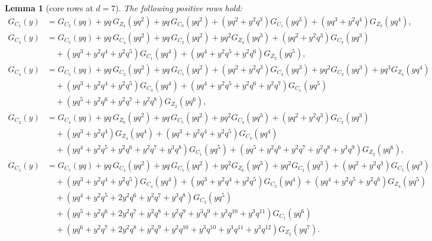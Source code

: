 \documentclass[11pt]{article}
\newtheorem{lemma}[theorem]{Lemma}
\newcommand{\G}[1]{G_{#1}}
\begin{document}
\begin{lemma}[core rows at $d=7$]\label{core}
The following positive rows hold:
\begin{align*}
\G{C_1}(y)&=\G{C_2}(yq)+yq\,\G{Z_4}(yq^{2})+yq\,\G{C_3}(yq^{2})
 +(yq^{2}{+}y^{2}q^{3})\G{C_1}(yq^{3})+(yq^{3}{+}y^{2}q^{4})\G{Z_2}(yq^{4}),\\[2pt]
\G{C_3}(y)&=\G{C_5}(yq)+yq\,\G{C_4}(yq^{2})+yq\,\G{C_2}(yq^{2})
 +yq^{2}\G{Z_4}(yq^{3})+(yq^{2}{+}y^{2}q^{3})\G{C_3}(yq^{3})\\&\quad
 +(yq^{3}{+}y^{2}q^{4}{+}y^{2}q^{5})\G{C_1}(yq^{4})
 +(yq^{4}{+}y^{2}q^{5}{+}y^{2}q^{6})\G{Z_2}(yq^{5}),\\[2pt]
\G{C_4}(y)&=\G{C_5}(yq)+yq\,\G{C_2}(yq^{2})+yq\,\G{C_5}(yq^{2})
 +(yq^{2}{+}y^{2}q^{3})\G{C_4}(yq^{3})+yq^{2}\G{C_2}(yq^{3})
 +yq^{3}\G{Z_4}(yq^{4})\\&\quad
 +(yq^{3}{+}y^{2}q^{4}{+}y^{2}q^{5})\G{C_3}(yq^{4})
 +(yq^{4}{+}y^{2}q^{5}{+}y^{2}q^{6}{+}y^{2}q^{7})\G{C_1}(yq^{5})\\&\quad
 +(yq^{5}{+}y^{2}q^{6}{+}y^{2}q^{7}{+}y^{2}q^{8})\G{Z_2}(yq^{6}),\\[2pt]
\G{C_2}(y)&=\G{C_4}(yq)+yq\,\G{Z_6}(yq^{2})+yq\,\G{C_5}(yq^{2})
 +yq^{2}\G{C_4}(yq^{3})+(yq^{2}{+}y^{2}q^{3})\G{C_2}(yq^{3})\\&\quad
 +(yq^{3}{+}y^{2}q^{4})\G{Z_4}(yq^{4})
 +(yq^{3}{+}y^{2}q^{4}{+}y^{2}q^{5})\G{C_3}(yq^{4})\\&\quad
 +(yq^{4}{+}y^{2}q^{5}{+}y^{2}q^{6}{+}y^{2}q^{7}{+}y^{3}q^{8})\G{C_1}(yq^{5})
 +(yq^{5}{+}y^{2}q^{6}{+}y^{2}q^{7}{+}y^{2}q^{8}{+}y^{3}q^{9})\G{Z_2}(yq^{6}),\\[2pt]
\G{C_5}(y)&=\G{C_5}(yq)+yq\,\G{C_4}(yq^{2})+yq\,\G{C_5}(yq^{2})
 +yq^{2}\G{Z_6}(yq^{3})+yq^{2}\G{C_2}(yq^{3})
 +(yq^{2}{+}y^{2}q^{3})\G{C_5}(yq^{3})\\&\quad
 +(yq^{3}{+}y^{2}q^{4}{+}y^{2}q^{5})\G{C_4}(yq^{4})
 +(yq^{3}{+}y^{2}q^{4}{+}y^{2}q^{5})\G{C_2}(yq^{4})
 +(yq^{4}{+}y^{2}q^{5}{+}y^{2}q^{6})\G{Z_4}(yq^{5})\\&\quad
 +(yq^{4}{+}y^{2}q^{5}{+}2y^{2}q^{6}{+}y^{2}q^{7}{+}y^{3}q^{8})\G{C_3}(yq^{5})\\&\quad
 +(yq^{5}{+}y^{2}q^{6}{+}2y^{2}q^{7}{+}y^{2}q^{8}{+}y^{2}q^{9}
   {+}y^{3}q^{9}{+}y^{3}q^{10}{+}y^{3}q^{11})\G{C_1}(yq^{6})\\&\quad
 +(yq^{6}{+}y^{2}q^{7}{+}2y^{2}q^{8}{+}y^{2}q^{9}{+}y^{2}q^{10}
   {+}y^{3}q^{10}{+}y^{3}q^{11}{+}y^{3}q^{12})\G{Z_2}(yq^{7}).
\end{align*}
\end{lemma}
\end{document}
